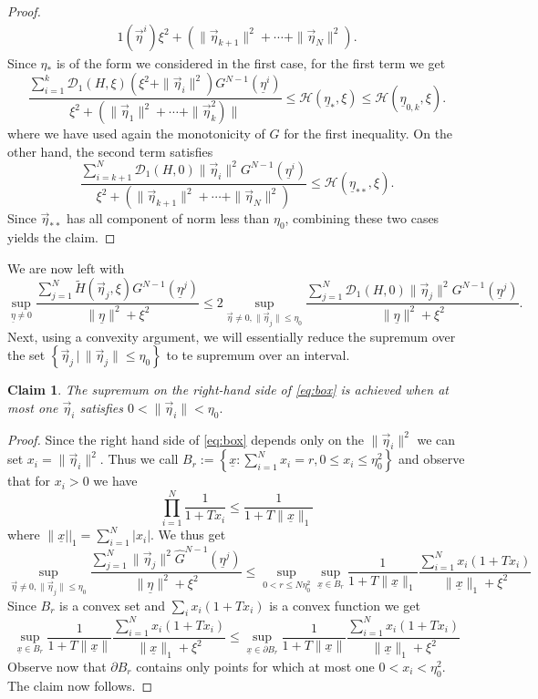 \documentclass{article}
\newcommand\calD{{\mathcal D}}
\newcommand \ul[1]{\underline{#1}}
\renewcommand\v[1]{\vec{#1}}
\newcommand\set[1]{\left\{ #1 \right\}}
\newtheorem{myclaim}{Claim}
\begin{document}
\begin{proof}
\begin{equation}
\begin{aligned}
{{{1}(\vec\eta^i)}{\xi^2 + (\|\v\eta_{k + 1}\|^2 + \cdots + \|\v\eta_N\|^2)}}.
\end{aligned}
\end{equation}
Since $\eta_*$ is of the form we considered in the first case, for the first term we get
\[
\frac{\sum_{i = 1}^k \calD_1(H,\xi)(\xi^2 + \|\v\eta_i\|^2)G^{N - 1}
(\ul\eta^i)}{\xi^2 + (\|\v\eta_1\|^2 + \cdots + \|\v\eta_k^2)\|} \leq 
\mathcal{H}(\ul\eta_{*},\xi) \leq \mathcal{H}(\ul\eta_{0,k},\xi).
\]
where we have used again the monotonicity of $G$ for the first inequality. On the other hand, the second term satisfies
\[
\frac{\sum_{i = k + 1}^N \calD_1(H,0) \|\v\eta_i\|^2 G^{N - 1}(\ul\eta^i)}
{\xi^2 + (\|\v\eta_{k + 1}\|^2  + \cdots + \|\v\eta_N\|^2)} \leq\mathcal H(\ul\eta_{**}, \xi).
\]
Since $\vec\eta_{**}$ has all component of norm less than $\eta_0$, combining these two cases yields the claim.
\end{proof}

We are now left with
\begin{equation}\label{eq:box}
\sup_{\ul\eta \ne 0} \frac{\sum_{j = 1}^N \widetilde H(\v\eta_j, \xi) G^{N - 1}(\ul\eta^j)}{\|\ul\eta\|^2 + \xi^2} \leq 
2 \sup_{\vec\eta \ne 0, \|\v\eta_j\| \leq \eta_0} \frac{\sum_{j = 1}^N \calD_1(H,0) \|\v\eta_j\|^2 
G^{N - 1}(\ul\eta^j)}{\|\ul\eta\|^2 + \xi^2}.
\end{equation}
Next, using a convexity argument, we will essentially reduce the supremum over the set $\set{\v\eta_j\,|\,\|\v\eta_j\| 
\leq \eta_0}$ to te supremum over an interval.

\begin{myclaim}
The supremum on the right-hand side of \eqref{eq:box} is achieved when at most one $\v\eta_i$ satisfies $0 < \|\v\eta_i\| 
< \eta_0.$
\end{myclaim}

\begin{proof}
Since the right hand side of \eqref{eq:box} depends only on the $\|\v\eta_i\|^2$ we can set $x_i=\|\v\eta_i\|^2$. Thus 
we call $B_r := \set{\ul x: \sum_{i=1}^N x_i = r, 0\leq x_i \leq \eta_0^2 }$ and observe that for  $x_i>0$ we have
\[
\prod_{i=1}^N \frac 1{1+T x_i}\leq \frac 1{1+ T\|\ul x\|_1}
\] 
where $\|\ul x||_1=\sum_{i=1}^N |x_i|$. We thus get
\[
 \sup_{\vec\eta \ne 0, \|\v\eta_j\| \leq \eta_0} \frac{\sum_{j = 1}^N \|\v\eta_j\|^2 \hat 
G^{N - 1}(\ul\eta^j)}{\|\ul\eta\|^2 + \xi^2}\leq\sup_{0<r\leq N\eta_0^2}\sup_{\ul x\in B_r}
\frac 1{1+T\|\ul x\|_1} \frac{\sum_{i=1}^N x_i(1+T x_i)}{\|\ul x\|_1+ \xi^2}
\]
Since $B_r$ is a convex set and $\sum_i x_i (1+T x_i)$ is a convex function we get
\[
\sup_{\ul x \in B_r}
\frac 1{1+T\|\ul x\|} \frac{\sum_{i=1}^N x_i(1+T x_i)}{\|\ul x\|_1+ \xi^2}\leq
\sup_{\ul x \in \partial B_r}
\frac 1{1+T\|\ul x\|} \frac{\sum_{i=1}^N x_i(1+T x_i)}{\|\ul x\|_1+ \xi^2}
\]
Observe now that $\partial B_r$ contains only points for which at most one $0<x_i<\eta_0^2$. The claim now follows.
\end{proof}
\end{document}
